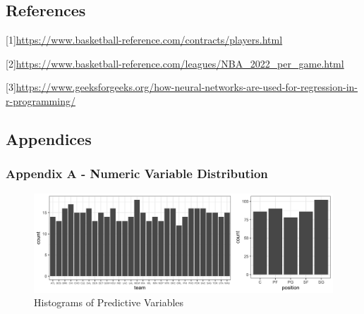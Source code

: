 \documentclass[
]{article}
\begin{document}
\newpage

\hypertarget{references}{%
\subsection{References}\label{references}}

{[}1{]}\url{https://www.basketball-reference.com/contracts/players.html}

{[}2{]}\url{https://www.basketball-reference.com/leagues/NBA_2022_per_game.html}

{[}3{]}\url{https://www.geeksforgeeks.org/how-neural-networks-are-used-for-regression-in-r-programming/}

\hypertarget{appendices}{%
\subsection{Appendices}\label{appendices}}

\hypertarget{appendix-a---numeric-variable-distribution}{%
\subsubsection{Appendix A - Numeric Variable
Distribution}\label{appendix-a---numeric-variable-distribution}}

\begin{figure}
\centering
\includegraphics{report_figures/figure_1.png}
\caption{Histograms of Predictive Variables}
\end{figure}
\end{document}
